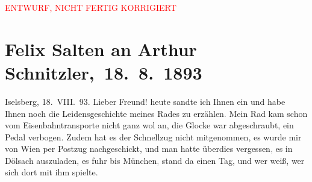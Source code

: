
\begin{center}
            \textcolor{red}{ENTWURF, NICHT FERTIG KORRIGIERT}
                      \end{center}
            
         
         \renewcommand{\erwaehntePersonen}{Personen: Franz Defregger, Marie Glümer, Felix Salten, Michael Emil Salzmann, Philipp Salzmann, Theodor Salzmann, Hermine von Schaffgotsch, Josefine Lydia von Weisswasser}
         \renewcommand{\erwaehnteOrte}{Orte: Ampezzo, Cortina d'Ampezzo, Dölsach, Großglockner, Heiligenblut am Großglockner, Iselsberg, Kaiser-Franz-Josefs-Höhe, Lienz, Mittewald an der Drau, München, Pasterze Glacier, Toblach, Wien}
         \renewcommand{\erwaehnteWerke}{}
               \section[ Felix Salten an Arthur Schnitzler, 18. 8. 1893]{ Felix Salten an Arthur Schnitzler, 18. 8. 1893}\nopagebreak{}\rehead{ }\begin{ledgroupsized}[t]{13cm}\normalsize\beginnumbering{} \toendnotes[C]{\smallbreak\pagebreak[2]} 
\toendnotes[C]{\smallbreak}\pstart
           \raggedleft{}{\pb}Iselsberg, 18. VIII. 93.\pend
           \pstart
           Lieber Freund!{ }heute sandte ich Ihnen ein \label{K_L03128-1v}\label{K_L03128-1h} und habe Ihnen noch die Leidensgeschichte meines Rades zu
                  erzählen\textcolor{gray}{.} Mein Rad kam schon vom Eisenbahntransporte nicht ganz
               wol an, die Glocke war abgeschraubt, ein Pedal verbogen. Zudem hat es der Schnellzug
               nicht mitgenommen, es wurde mir von Wien per
               Postzug nachgeschickt, und man hatte überdies vergessen\textcolor{gray}{,} es in Dölsach auszuladen, es fuhr bis München\textcolor{gray}{,} stand da einen Tag, und wer weiß, wer sich dort mit ihm spielte.

\end{ledgroupsized}

